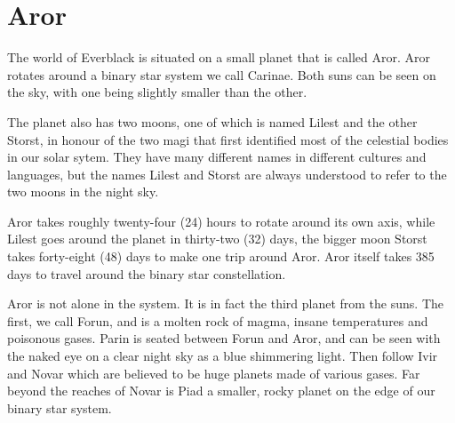 \chapter{Aror}
\label{sec:Aror}

The world of Everblack is situated on a small planet that is called Aror. Aror
rotates around a binary star system we call Carinae. Both suns can be seen on
the sky, with one being slightly smaller than the other.

The planet also has two moons, one of which is named Lilest and the other
Storst, in honour of the two magi that first identified most of the celestial
bodies in our solar sytem. They have many different names in different
cultures and languages, but the names Lilest and Storst are always understood
to refer to the two moons in the night sky.

Aror takes roughly twenty-four (24) hours to rotate around its own axis, while
Lilest goes around the planet in thirty-two (32) days, the bigger moon Storst
takes forty-eight (48) days to make one trip around Aror. Aror itself takes
385 days to travel around the binary star constellation.

Aror is not alone in the system. It is in fact the third planet from the
suns. The first, we call Forun, and is a molten rock of magma, insane
temperatures and poisonous gases. Parin is seated between Forun and Aror, and
can be seen with the naked eye on a clear night sky as a blue shimmering
light. Then follow Ivir and Novar which are believed to be huge planets made
of various gases. Far beyond the reaches of Novar is Piad a smaller, rocky
planet on the edge of our binary star system.


















